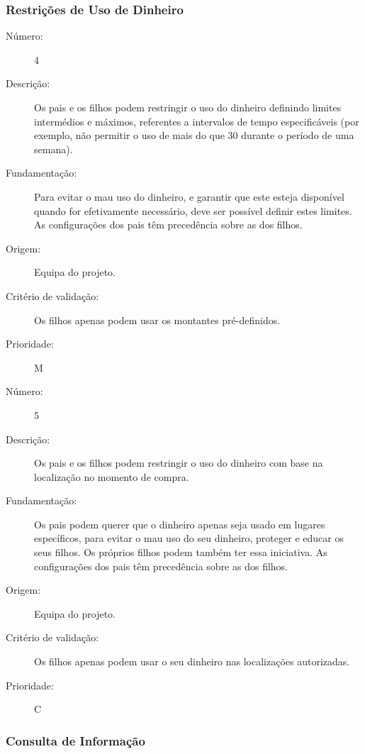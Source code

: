 \documentclass{article}
\begin{document}
    \subsubsection{Restrições de Uso de Dinheiro}  

      \begin{description}
        \item[Número:]4
        \item[Descrição:]Os pais e os filhos podem restringir o uso do dinheiro definindo limites intermédios e máximos, referentes a intervalos de tempo especificáveis (por exemplo, não permitir o uso de mais do que 30\EUR{} durante o período de uma semana). 
        \item[Fundamentação:]Para evitar o mau uso do dinheiro, e garantir que este esteja disponível quando for efetivamente necessário, deve ser possível definir estes limites. As configurações dos pais têm precedência sobre as dos filhos.
        \item[Origem:]Equipa do projeto.
        \item[Critério de validação:]Os filhos apenas podem usar os montantes pré-definidos.
        \item[Prioridade:]M
      \end{description}
\vspace{0.5cm}
      \begin{description}
        \item[Número:]5
        \item[Descrição:]Os pais e os filhos podem restringir o uso do dinheiro com base na localização no momento de compra.
        \item[Fundamentação:]Os pais podem querer que o dinheiro apenas seja usado em lugares específicos, para evitar o mau uso do seu dinheiro, proteger e educar os seus filhos. Os próprios filhos podem também ter essa iniciativa. As configurações dos pais têm precedência sobre as dos filhos.
        \item[Origem:]Equipa do projeto.
        \item[Critério de validação:]Os filhos apenas podem usar o seu dinheiro nas localizações autorizadas.
        \item[Prioridade:]C
      \end{description}


    \subsubsection{Consulta de Informação}
\end{document}
